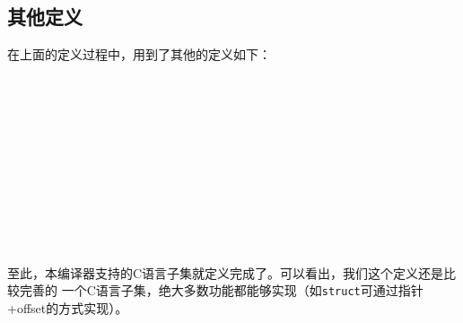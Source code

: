 \subsection{其他定义}

在上面的定义过程中，用到了其他的定义如下：
\begin{bnf}
	{\bnfor{}}\\
	\\
	{}\\
	\\
	\\
	\\
	{\bnfsk{}\bnfor{}\bnfsk{}}\\
	{\bnfsk{}}\\
	{\bnfor{}}\\
	{\bnfor{}\bnfor{}}\\
	{\bnfsp{}\bnfsp{}}
\end{bnf}

至此，本编译器支持的C语言子集就定义完成了。可以看出，我们这个定义还是比较完善的
一个C语言子集，绝大多数功能都能够实现（如{\tt struct}可通过指针+offset的方式实现）。
